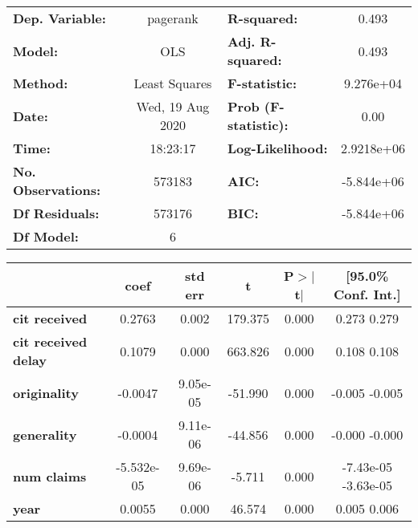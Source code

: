 \begin{center}
\begin{tabular}{lclc}
\toprule
\textbf{Dep. Variable:}     &     pagerank     & \textbf{  R-squared:         } &       0.493     \\
\textbf{Model:}             &       OLS        & \textbf{  Adj. R-squared:    } &       0.493     \\
\textbf{Method:}            &  Least Squares   & \textbf{  F-statistic:       } &   9.276e+04     \\
\textbf{Date:}              & Wed, 19 Aug 2020 & \textbf{  Prob (F-statistic):} &       0.00      \\
\textbf{Time:}              &     18:23:17     & \textbf{  Log-Likelihood:    } &   2.9218e+06    \\
\textbf{No. Observations:}  &      573183      & \textbf{  AIC:               } &   -5.844e+06    \\
\textbf{Df Residuals:}      &      573176      & \textbf{  BIC:               } &   -5.844e+06    \\
\textbf{Df Model:}          &           6      & \textbf{                     } &                 \\
\bottomrule
\end{tabular}
\begin{tabular}{lccccc}
                            & \textbf{coef} & \textbf{std err} & \textbf{t} & \textbf{P$>$$|$t$|$} & \textbf{[95.0\% Conf. Int.]}  \\
\midrule
\textbf{cit received}       &       0.2763  &        0.002     &   179.375  &         0.000        &         0.273     0.279       \\
\textbf{cit received delay} &       0.1079  &        0.000     &   663.826  &         0.000        &         0.108     0.108       \\
\textbf{originality}        &      -0.0047  &     9.05e-05     &   -51.990  &         0.000        &        -0.005    -0.005       \\
\textbf{generality}         &      -0.0004  &     9.11e-06     &   -44.856  &         0.000        &        -0.000    -0.000       \\
\textbf{num claims}         &   -5.532e-05  &     9.69e-06     &    -5.711  &         0.000        &     -7.43e-05 -3.63e-05       \\
\textbf{year}               &       0.0055  &        0.000     &    46.574  &         0.000        &         0.005     0.006       \\

\end{tabular}
\end{center}

